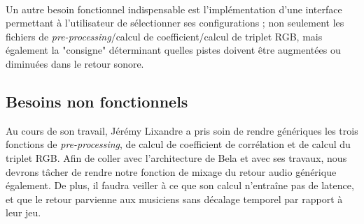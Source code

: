 \paragraph{}
Un autre besoin fonctionnel indispensable est l'implémentation d'une
interface permettant à l'utilisateur de sélectionner ses
configurations ; non seulement les fichiers de
\textit{pre-processing}/calcul de coefficient/calcul de triplet RGB,
mais également la "consigne" déterminant quelles pistes doivent être
augmentées ou diminuées dans le retour sonore.

\subsection{Besoins non fonctionnels}
Au cours de son travail, Jérémy Lixandre a pris soin de rendre
génériques les trois fonctions de \textit{pre-processing}, de calcul
de coefficient de corrélation et de calcul du triplet RGB. Afin de
coller avec l'architecture de Bela et avec ses travaux, nous devrons
tâcher de rendre notre fonction de mixage du retour audio générique
également. De plus, il faudra veiller à ce que son calcul n'entraîne
pas de latence, et que le retour parvienne aux musiciens sans décalage
temporel par rapport à leur jeu.

